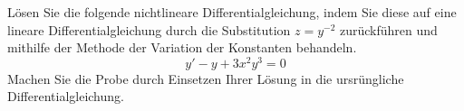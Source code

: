 \begin{atiTask}[
	title = Eine nichtlineare Differentialgleichung,
	topic = Gewöhnliche Differentialgleichungen,
	subtopic = Lineare Differentialgleichungen 1. Ordnung,
	language = Deutsch,
]
	Lösen Sie die folgende nichtlineare Differentialgleichung, indem Sie diese auf eine lineare Differentialgleichung durch die Substitution $z = y^{-2}$ zurückführen und mithilfe der Methode der Variation der Konstanten behandeln.
	\[
		y' - y + 3x^2y^3 = 0
	\]
	Machen Sie die Probe durch Einsetzen Ihrer Lösung in die ursrüngliche Differentialgleichung.
\end{atiTask}